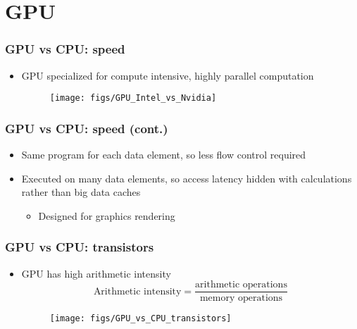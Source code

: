 \section{GPU}
\begin{frame}\frametitle{GPU vs CPU: speed}\logoEvolution\mypagenum
	\begin{itemize}
		\item GPU specialized for compute intensive, highly parallel computation
		\begin{figure}
			\texttt{[image: figs/GPU\_Intel\_vs\_Nvidia]}
		\end{figure}
	\end{itemize}
\end{frame}



\begin{frame}\frametitle{GPU vs CPU: speed (cont.)}\logoEvolution\mypagenum
	\begin{itemize}
		\item Same program for each data element, so less flow control required
		\item Executed on many data elements, so access latency hidden with calculations rather than big data caches
		\begin{itemize}
			\item Designed for graphics rendering
		\end{itemize}
	\end{itemize}
\end{frame}




\begin{frame}\frametitle{GPU vs CPU: transistors}\logoEvolution\mypagenum
	\begin{itemize}
		\item GPU has high arithmetic intensity
		\begin{equation*}
			\text{Arithmetic \ intensity} = \frac{\text{arithmetic \ operations}}{\text{memory \ operations}}
		\end{equation*}
		\begin{figure}
			\texttt{[image: figs/GPU\_vs\_CPU\_transistors]}
		\end{figure}
	\end{itemize}
\end{frame}





